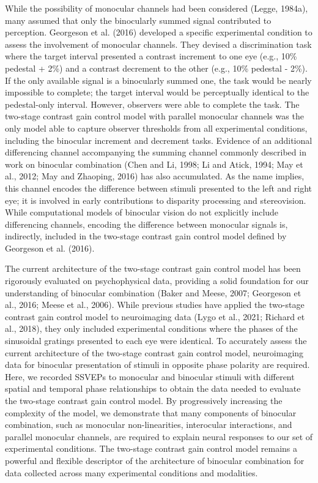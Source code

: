\documentclass[
  12pt,
]{article}
\begin{document}
While the possibility of monocular channels had been considered (Legge,
1984a), many assumed that only the binocularly summed signal contributed
to perception. Georgeson et al. (2016) developed a specific experimental
condition to assess the involvement of monocular channels. They devised
a discrimination task where the target interval presented a contrast
increment to one eye (e.g., 10\% pedestal + 2\%) and a contrast
decrement to the other (e.g., 10\% pedestal - 2\%). If the only
available signal is a binocularly summed one, the task would be nearly
impossible to complete; the target interval would be perceptually
identical to the pedestal-only interval. However, observers were able to
complete the task. The two-stage contrast gain control model with
parallel monocular channels was the only model able to capture observer
thresholds from all experimental conditions, including the binocular
increment and decrement tasks. Evidence of an additional differencing
channel accompanying the summing channel commonly described in work on
binocular combination (Chen and Li, 1998; Li and Atick, 1994; May et
al., 2012; May and Zhaoping, 2016) has also accumulated. As the name
implies, this channel encodes the difference between stimuli presented
to the left and right eye; it is involved in early contributions to
disparity processing and stereovision. While computational models of
binocular vision do not explicitly include differencing channels,
encoding the difference between monocular signals is, indirectly,
included in the two-stage contrast gain control model defined by
Georgeson et al. (2016).

The current architecture of the two-stage contrast gain control model
has been rigorously evaluated on psychophysical data, providing a solid
foundation for our understanding of binocular combination (Baker and
Meese, 2007; Georgeson et al., 2016; Meese et al., 2006). While previous
studies have applied the two-stage contrast gain control model to
neuroimaging data (Lygo et al., 2021; Richard et al., 2018), they only
included experimental conditions where the phases of the sinusoidal
gratings presented to each eye were identical. To accurately assess the
current architecture of the two-stage contrast gain control model,
neuroimaging data for binocular presentation of stimuli in opposite
phase polarity are required. Here, we recorded SSVEPs to monocular and
binocular stimuli with different spatial and temporal phase
relationships to obtain the data needed to evaluate the two-stage
contrast gain control model. By progressively increasing the complexity
of the model, we demonstrate that many components of binocular
combination, such as monocular non-linearities, interocular
interactions, and parallel monocular channels, are required to explain
neural responses to our set of experimental conditions. The two-stage
contrast gain control model remains a powerful and flexible descriptor
of the architecture of binocular combination for data collected across
many experimental conditions and modalities.
\end{document}
